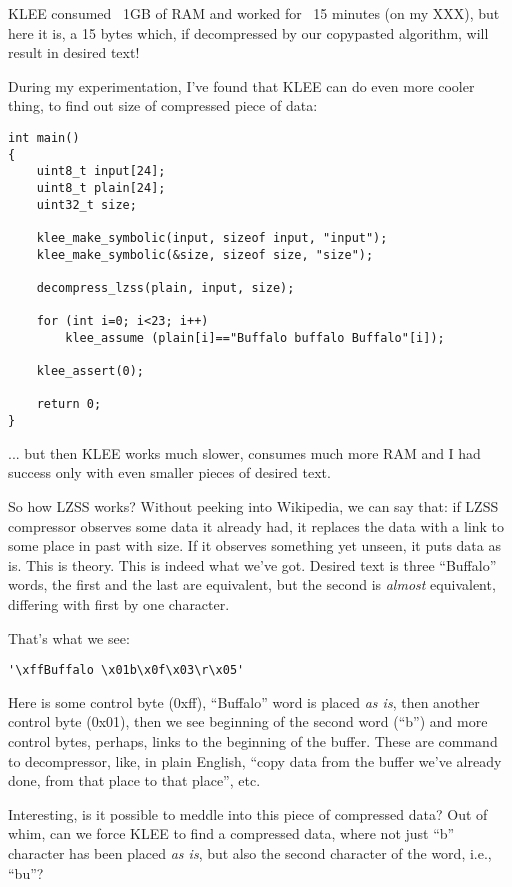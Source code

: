 KLEE consumed ~1GB of RAM and worked for ~15 minutes (on my XXX), 
but here it is, a 15 bytes which, if decompressed by our copypasted algorithm, will result in desired text!

During my experimentation, I've found that KLEE can do even more cooler thing, to find out size of compressed piece of data:

\begin{lstlisting}
int main()
{
	uint8_t input[24];
	uint8_t plain[24];
	uint32_t size;
  
	klee_make_symbolic(input, sizeof input, "input");
	klee_make_symbolic(&size, sizeof size, "size");
	
	decompress_lzss(plain, input, size);

	for (int i=0; i<23; i++)
		klee_assume (plain[i]=="Buffalo buffalo Buffalo"[i]);

	klee_assert(0);
	
	return 0;
}
\end{lstlisting}

... but then KLEE works much slower, consumes much more RAM and I had success only with even smaller pieces of desired text.

So how LZSS works? Without peeking into Wikipedia, we can say that: 
if LZSS compressor observes some data it already had, it replaces the data with a link to some place in past with size. 
If it observes something yet unseen, it puts data as is.
This is theory.
This is indeed what we've got. Desired text is three ``Buffalo'' words, the first and the last are equivalent, but the second is \textit{almost} equivalent, 
differing with first by one character.

That's what we see:

\begin{lstlisting}
'\xffBuffalo \x01b\x0f\x03\r\x05'
\end{lstlisting}

Here is some control byte (0xff), ``Buffalo'' word is placed \textit{as is}, then another control byte (0x01), 
then we see beginning of the second word (``b'') and more
control bytes, perhaps, links to the beginning of the buffer.
These are command to decompressor, like, in plain English, ``copy data from the buffer we've already done, from that place to that place'', etc.

Interesting, is it possible to meddle into this piece of compressed data?
Out of whim, can we force KLEE to find a compressed data, where not just ``b'' character has been placed \textit{as is},
but also the second character of the word, i.e., ``bu''?


